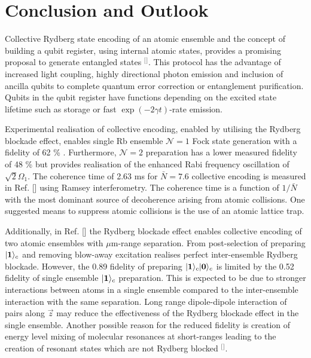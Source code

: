 \section{\label{sec:level1}Conclusion and Outlook}
Collective Rydberg state encoding of an atomic ensemble and the concept of building a qubit register, using internal atomic states, provides a promising proposal to generate entangled states $^{[}$\citep{Pedersen2009FewEncoding}$^{]}$. This protocol has the advantage of increased light coupling, highly directional photon emission and inclusion of ancilla qubits to complete quantum error correction or entanglement purification. Qubits in the qubit register have functions depending on the excited state lifetime such as storage or fast $\exp(-2\gamma t)$-rate emission.      

Experimental realisation of collective encoding, enabled by utilising the Rydberg blockade effect, enables single Rb ensemble $\mathcal{N}=1$ Fock state generation with a fidelity of 62 \% \citep{Ebert2014AtomicBlockade}. Furthermore, $\mathcal{N}=2$ preparation has a lower measured fidelity of 48 \%  but provides realisation of the enhanced Rabi frequency oscillation of $\sqrt{2}\Omega_{1}$. The coherence time of 2.63 ms for $\bar{N}=7.6$ collective encoding is measured in Ref. [] using Ramsey interferometry. The coherence time is a function of $1/\bar{N}$ with the most dominant source of decoherence arising from atomic collisions. One suggested means to suppress atomic collisions is the use of an atomic lattice trap. 

Additionally, in Ref. [] the Rydberg blockade effect enables collective encoding of two atomic ensembles with $\mu$m-range separation. From post-selection of preparing $\lvert\textbf{1}\rangle_{c}$ and removing blow-away excitation realises perfect inter-ensemble Rydberg blockade. However, the 0.89 fidelity of preparing $\lvert\textbf{1}\rangle_{c}\lvert\textbf{0}\rangle_{c}$ is limited by the 0.52 fidelity of single ensemble $\lvert\textbf{1}\rangle_{c}$ preparation. This is expected to be due to stronger interactions between atoms in a single ensemble compared to the inter-ensemble interaction with the same separation. Long range dipole-dipole interaction of pairs along $\vec{z}$ may reduce the effectiveness of the Rydberg blockade effect in the single ensemble. Another possible reason for the reduced fidelity is creation of energy level mixing of molecular resonances at short-ranges leading to the creation of resonant states which are not Rydberg blocked $^{[}$\citep{Derevianko2015EffectsBlockade}$^{]}$. 

